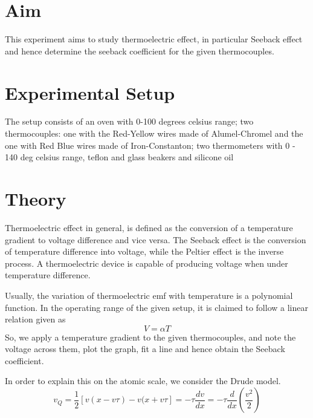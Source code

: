 \documentclass[12pt,a4paper]{article} %
\begin{document}
    \title{\rmfamily\normalfont{}}
    \author{}
    \date{} %
    \pagestyle{plain}

    \maketitle
    
       
    
    \section{Aim}
    This experiment aims to study thermoelectric effect, in particular Seeback effect and hence determine the seeback coefficient for the given thermocouples. 
    
    
    \section{Experimental Setup}
    The setup consists of an oven with 0-100 degrees celsius range; two thermocouples: one with the Red-Yellow wires made of Alumel-Chromel and the one with Red Blue wires made of Iron-Constanton; two thermometers with 0 - 140 deg celsius range, teflon and glass beakers and silicone oil
    
    \section{Theory}
    Thermoelectric effect in general, is defined as the conversion of a temperature gradient to voltage difference and vice versa. The Seeback effect is the conversion of temperature difference into voltage, while the Peltier effect is the inverse process. 
    A thermoelectric device is capable of producing voltage when under temperature difference. 
    
    Usually, the variation of thermoelectric emf with temperature is a polynomial function. In the operating range of the given setup, it is claimed to follow a linear relation given as
    \begin{equation*}
        V= \alpha T
    \end{equation*}
    So, we apply a temperature gradient to the given thermocouples, and note the voltage across them, plot the graph, fit a line and hence obtain the Seeback coefficient. \\
    \par
    In order to explain this on the atomic scale, we consider the Drude model.
    \begin{equation*}
    v_Q = \frac{1}{2} [v(x-v\tau) - v(x+v\tau] = -\tau \frac{dv}{dx} = -\tau \frac{d}{dx}\left( \frac{v^2}{2}\right)
    \end{equation*}
    
\end{document}
